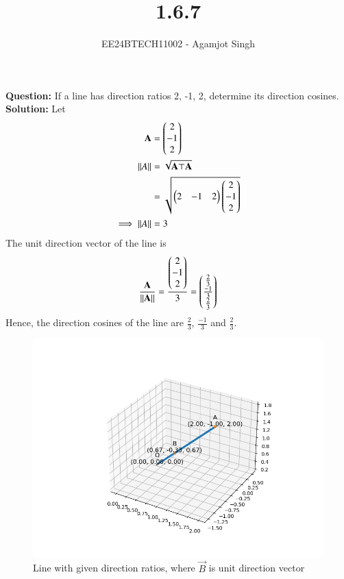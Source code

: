\documentclass[journal]{IEEEtran}
\begin{document}

\vspace{3cm}

\title{1.6.7}
\author{EE24BTECH11002 - Agamjot Singh
}
{\let\newpage\relax\maketitle}

\renewcommand{\thefigure}{\theenumi}
\renewcommand{\thetable}{\theenumi}
\setlength{\intextsep}{10pt} %

\textbf{Question:}
\newline
If a line has direction ratios 2, -1, 2, determine its direction cosines.
\newline
\textbf{Solution:}
\newline
Let 
\begin{align}
	\mathbf{A} &= \begin{pmatrix}2\\-1\\2\end{pmatrix}\\
	\left\lVert A\right\rVert &= \sqrt{\mathbf{A}\top\mathbf{A}}\\
		     &= \sqrt{\begin{pmatrix}2 & -1 & 2\end{pmatrix}\begin{pmatrix}2\\-1\\2\end{pmatrix}}\\
	\implies \left\lVert A\right\rVert &= 3
\end{align}
The unit direction vector of the line is
\begin{align}
	\frac{\mathbf{A}}{\left\lVert\mathbf{A}\right\rVert} = \frac{\begin{pmatrix}2\\-1\\2\end{pmatrix}}{3} = \begin{pmatrix}\frac{2}{3}\\\frac{-1}{3}\\\frac{2}{3}\end{pmatrix}
\end{align}
Hence, the direction cosines of the line are $\frac{2}{3}$, $\frac{-1}{3}$ and $\frac{2}{3}$.

\begin{figure}[h!]
   \centering
   \includegraphics[width=0.7\linewidth]{figs/graph.png}
   \caption{Line with given direction ratios, where $\vec{B}$ is unit direction vector}
\end{figure}
\end{document}
